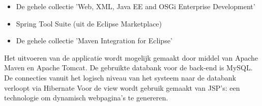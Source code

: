 \begin{itemize}
	\item De gehele collectie 'Web, XML, Java EE and OSGi Enterprise Development'	
	\item Spring Tool Suite (uit de Eclipse Marketplace)
	\item De gehele collectie 'Maven Integration for Eclipse'
\end{itemize}
\noindent
Het uitvoeren van de applicatie wordt mogelijk gemaakt door middel van Apache Maven\cite{Maven} en Apache Tomcat\cite{Tomcat}.
De gebruikte databank voor de back-end is MySQL.
De connecties vanuit het logisch niveau van het systeem naar de databank verloopt via Hibernate\cite{hibernate} 
Voor de view wordt gebruik gemaakt van JSP's: een technologie om dynamisch webpagina's te genereren.
